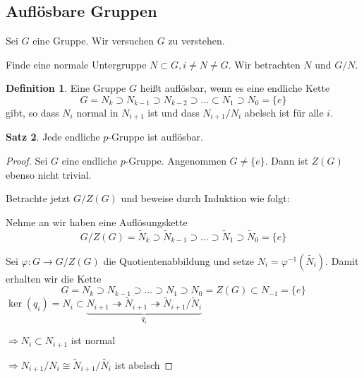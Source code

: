 \documentclass[12pt,parskip=full]{scrartcl}
\theoremstyle{definition}
\newtheorem{theorem}{Satz}[section]
\newtheorem{definition}[theorem]{Definition}
\theoremstyle{remark}
\begin{document}
	\subsection{Auflösbare Gruppen}
	
	Sei $G$ eine Gruppe. Wir versuchen $G$ zu verstehen.
	
	Finde eine normale Untergruppe $N \subset G, i \neq N \neq G$. Wir betrachten $N$ und $G/N$.
	
	\begin{definition}
		Eine Gruppe $G$ heißt auflösbar, wenn es eine endliche Kette
		\begin{equation*}
			G = N_k \supset N_{k-1} \supset N_{k-2} \supset \dots \subset N_1 \supset N_0 = \{ e \}
		\end{equation*}
		gibt, so dass $N_i$ normal in $N_{i+1}$ ist und dass $N_{i+1}/N_i$ abelsch ist für alle $i$.
	\end{definition}

	\begin{theorem}
		Jede endliche $p$-Gruppe ist auflösbar.
	\end{theorem}
	
	\begin{proof}
		Sei $G$ eine endliche $p$-Gruppe. Angenommen $G \neq \{ e \}$. Dann ist $Z(G)$ ebenso nicht trivial.
		
		Betrachte jetzt $G/Z(G)$ und beweise durch Induktion wie folgt:
		
		Nehme an wir haben eine Auflösungskette
		\begin{equation*}
			G/Z(G) = \tilde{N}_k \supset \tilde{N}_{k-1} \supset \dots \supset \tilde{N}_1 \supset \tilde{N}_0 = \{ e \}
		\end{equation*}
		
		Sei $\varphi: G \to G/Z(G)$ die Quotientenabbildung und setze $N_i = \varphi^{-1}(\tilde{N_i})$. Damit erhalten wir die Kette
		\begin{equation*}
			G = N_k \supset N_{k-1} \supset \dots \supset N_1 \supset N_0 = Z(G) \subset N_{-1} = \{ e \}
		\end{equation*}
		$\ker(q_i) = N_i \subset\underbrace{ N_{i+1} \twoheadrightarrow \tilde{N}_{i+1} \twoheadrightarrow \tilde{N}_{i+1}/\tilde{N}_i}_{q_i}$
		
		$\Rightarrow N_i \subset N_{i+1}$ ist normal
		
		$\Rightarrow N_{i+1}/N_i \cong \tilde{N}_{i+1}/\tilde{N_i}$ ist abelsch		
	\end{proof}
	
\end{document}
